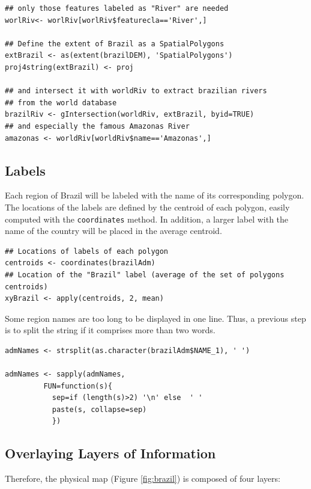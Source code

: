 \documentclass[smallroyalvopaper]{memoir}
\begin{document}

\lstset{language=R,numbers=none}
\begin{lstlisting}
## only those features labeled as "River" are needed
worlRiv<- worlRiv[worlRiv$featurecla=='River',]

## Define the extent of Brazil as a SpatialPolygons
extBrazil <- as(extent(brazilDEM), 'SpatialPolygons')
proj4string(extBrazil) <- proj

## and intersect it with worldRiv to extract brazilian rivers
## from the world database
brazilRiv <- gIntersection(worldRiv, extBrazil, byid=TRUE)
## and especially the famous Amazonas River
amazonas <- worldRiv[worldRiv$name=='Amazonas',]
\end{lstlisting}
\subsection{Labels}
\label{sec-1-3}
Each region of Brazil will be labeled with the name of its
corresponding polygon. The locations of the labels are defined by the
centroid of each polygon, easily computed with the \texttt{coordinates}
method. In addition, a larger label with the name of the country will be
placed in the average centroid.


\lstset{language=R,numbers=none}
\begin{lstlisting}
## Locations of labels of each polygon
centroids <- coordinates(brazilAdm)
## Location of the "Brazil" label (average of the set of polygons centroids)
xyBrazil <- apply(centroids, 2, mean)
\end{lstlisting}

Some region names are too long to be displayed in one line. Thus, a
previous step is to split the string if it comprises more than two
words.


\lstset{language=R,numbers=none}
\begin{lstlisting}
admNames <- strsplit(as.character(brazilAdm$NAME_1), ' ')

admNames <- sapply(admNames,
		 FUN=function(s){
		   sep=if (length(s)>2) '\n' else  ' '
		   paste(s, collapse=sep)
		   })
\end{lstlisting}
\subsection{Overlaying Layers of Information}
\label{sec-1-4}
Therefore, the physical map (Figure \ref{fig:brazil}) is composed
of four layers: 
\end{document}
